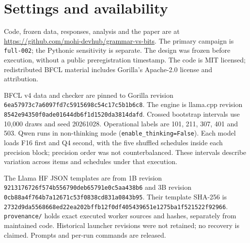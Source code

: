 \appendix
\section{Settings and availability}\label{app:settings}
Code, frozen data, responses, analysis and the paper are at \url{https://github.com/mohi-devhub/grammar-vs-bits}. The primary campaign is \texttt{full-002}; the Pythonic sensitivity is separate. The design was frozen before execution, without a public preregistration timestamp. The code is MIT licensed; redistributed BFCL material includes Gorilla's Apache-2.0 license and attribution.

BFCL v4 data and checker are pinned to Gorilla revision \texttt{6ea57973c7a6097f}\allowbreak\texttt{d7c5915698c54c17}\allowbreak\texttt{c5b1b6c8}. The engine is llama.cpp revision \texttt{8542e94350f0ade0}\allowbreak\texttt{1644db6f1d1520da}\allowbreak\texttt{3814dafd}. Crossed bootstrap intervals use 10,000 draws and seed 20261028. Operational labels are 101, 211, 307, 401 and 503. Qwen runs in non-thinking mode (\texttt{enable\_thinking=False}). Each model loads F16 first and Q4 second, with the five shuffled schedules inside each precision block; precision order was not counterbalanced. These intervals describe variation across items and schedules under that execution.

The Llama HF JSON templates are from 1B revision \texttt{9213176726f574b5}\allowbreak\texttt{56790deb65791e0c}\allowbreak\texttt{5aa438b6} and 3B revision \texttt{0cb88a4f764b7a12}\allowbreak\texttt{671c53f0838cd831}\allowbreak\texttt{a0843b95}. Their template SHA-256 is \texttt{2732d9da5568668e}\allowbreak\texttt{d22ea202bffb12f0}\allowbreak\texttt{df405439651e1275}\allowbreak\texttt{ba1f521522f92966}. \texttt{provenance/} holds exact executed worker sources and hashes, separately from maintained code. Historical launcher revisions were not retained; no recovery is claimed. Prompts and per-run commands are released.
